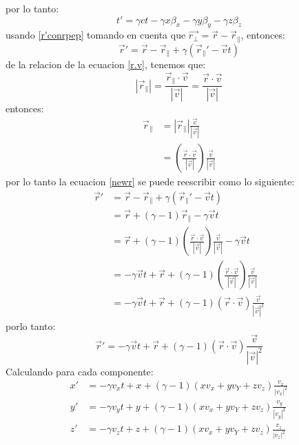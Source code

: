 \documentclass[12pt,letterpaper]{report}
\begin{document}
por lo tanto:
\begin{equation}
    t' = \gamma ct - \gamma x \beta_x - \gamma y \beta_y - \gamma z \beta_z
    \label{t'beta}
\end{equation}
usando \ref{r'conrpep} tomando en cuenta que $\vec{r_\perp}= \vec{r}-\vec{r}_\parallel$, entonces:
\begin{equation}
    \vec{r}'=\vec{r}-\vec{r}_\parallel+\gamma (\vec{r}_\parallel' - \vec{v}t)
    \label{newr}
\end{equation}
de la relacion de la ecuacion \ref{r.v}, tenemos que:
\begin{equation}
    |\vec{r}_\parallel| = \frac{\vec{r}_\parallel \cdot \vec{v}}{|\vec{v}|} =\frac{\vec{r}\cdot \vec{v}}{|\vec{v}|} 
    \label{rparalel}
\end{equation}
entonces:
\begin{align*}
\vec{r}_\parallel   &= |\vec{r}_\parallel| \frac{\vec{v}}{|\vec{v}|}\\
                    &=\left(\frac{\vec{r}\cdot \vec{v}}{|\vec{v}|} \right) \frac{\vec{v}}{|\vec{v}|}
\end{align*}
por lo tanto la ecuacion \ref{newr} se puede reescribir como lo siguiente:
\begin{align*}
    \vec{r}'&=\vec{r}-\vec{r}_\parallel+\gamma (\vec{r}_\parallel' - \vec{v}t)\\
            &=\vec{r}+(\gamma-1) \vec{r}_\parallel - \gamma\vec{v} t\\
            &=\vec{r}+(\gamma-1) \left(\frac{\vec{r}\cdot \vec{v}}{|\vec{v}|} \right)\frac{\vec{v}}{|\vec{v}|} - \gamma \vec{v} t\\
            &=-\gamma \vec{v}t + \vec{r} + (\gamma-1) \left(\frac{\vec{r}\cdot \vec{v}}{|\vec{v}|} \right)\frac{\vec{v}}{|\vec{v}|}\\
            &= - \gamma \vec{v} t + \vec{r} + (\gamma-1)(\vec{r} \cdot \vec{v}) \frac{\vec{v}}{|\vec{v}|^2}
\end{align*}
porlo tanto:
\begin{equation}
\vec{r}' = - \gamma \vec{v} t + \vec{r} + (\gamma-1)(\vec{r} \cdot \vec{v}) \frac{\vec{v}}{|\vec{v}|^2}
\end{equation}
Calculando para cada componente:
\begin{align*}
    x'&=-\gamma v_x t + x +(\gamma -1) (xv_x+yv_Y+zv_z) \frac{v_x}{|v_x|^2}\\
    y'&=-\gamma v_y t + y +(\gamma -1) (xv_x+yv_Y+zv_z) \frac{v_y}{|v_y|^2}\\
    z'&=-\gamma v_z t + z+(\gamma -1) (xv_x+yv_Y+zv_z) \frac{v_z}{|v_z|^2}
\end{align*}
\end{document}
